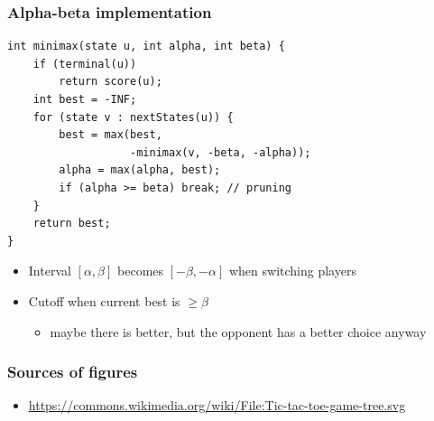 \documentclass[12pt]{beamer}
\begin{document}
\begin{frame}[fragile]
\frametitle{Alpha-beta implementation}
\begin{lstlisting}
int minimax(state u, int alpha, int beta) {
    if (terminal(u))
        return score(u);
    int best = -INF;
    for (state v : nextStates(u)) {
        best = max(best,
                   -minimax(v, -beta, -alpha));
        alpha = max(alpha, best);
        if (alpha >= beta) break; // pruning
    }
    return best;
}
\end{lstlisting}
\begin{itemize}
\item Interval $[\alpha,\beta]$ becomes $[-\beta,-\alpha]$ when switching players
\item Cutoff when current best is $\geq \beta$
\begin{itemize} \item maybe there is better, but the opponent has a better choice anyway \end{itemize}
\end{itemize}
\end{frame}

\begin{frame}
\frametitle{Sources of figures}
\begin{itemize}
\item \url{https://commons.wikimedia.org/wiki/File:Tic-tac-toe-game-tree.svg}
\end{itemize}
\end{frame}
\end{document}
